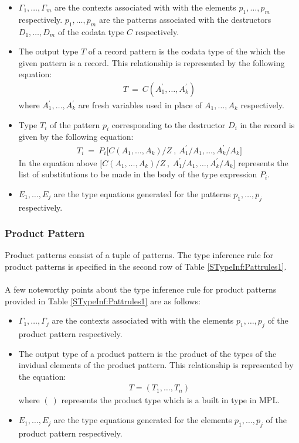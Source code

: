 \documentclass[11pt]{article}
\begin{document}
\begin{itemize}
  \item ${\Gamma_1,\ldots,\Gamma_m}$ are the contexts associated with with the elements ${p_1,\ldots,p_m}$ respectively. ${p_1,\ldots,p_m}$ are the patterns associated with the destructors ${D_1,\ldots,D_m}$ of the codata type ${C}$ respectively.
  \item The output type ${T}$ of a record pattern is the codata type of the which the given pattern is a record. This relationship is represented by the following equation:
  \begin{align*}
  T~=~C(A_1^\prime,\ldots,A_k^\prime)
  \end{align*}
  where ${A_1^\prime,\ldots,A_k^\prime}$ are fresh variables used in place of ${A_1,\ldots,A_k}$ respectively.
  \item Type ${T_i}$ of the pattern ${p_i}$ corresponding to the destructor ${D_i}$ in the record is given by the following equation:
  \begin{align*}
  T_i~=~P_i\Big[C(A_1,\ldots,A_k)/Z~,~A_1^\prime/A_1,\ldots,A_k^\prime/A_k\Big]
  \end{align*} 
  In the equation above ${\Big[C(A_1,\ldots,A_k)/Z~,~A_1^\prime/A_1,\ldots,A_k^\prime/A_k\Big]}$ represents the list of substitutions to be made in the body of the type expression ${P_i}$.
  \item ${E_1,\ldots,E_j}$ are the type equations generated for the patterns ${p_1,\ldots,p_j}$ respectively.
\end{itemize}



\subsubsection {Product Pattern}
Product patterns consist of a tuple of patterns. The type inference rule for product patterns is specified in the second row of Table \ref{STypeInf:Pattrules1}.  
~~\\~\\
A few noteworthy points about the type inference rule for product patterns provided in Table \ref{STypeInf:Pattrules1} are as follows:
\begin{itemize} 
  \item ${\Gamma_1,\ldots,\Gamma_j}$ are the contexts associated with with the elements ${p_1,\ldots,p_j}$ of the product pattern respectively.
  \item The output type of a product pattern is the product of the types of the invidual elements of the product pattern. This relationship is represented by the equation:
  \begin{align*}
   T = (T_1,\ldots,T_n)
  \end{align*}
  where ${(~)}$ represents the product type which is a built in type in MPL.
  \item ${E_1,\ldots,E_j}$ are the type equations generated for the elements ${p_1,\ldots,p_j}$ of the product pattern respectively.
\end{itemize}  
\end{document}
